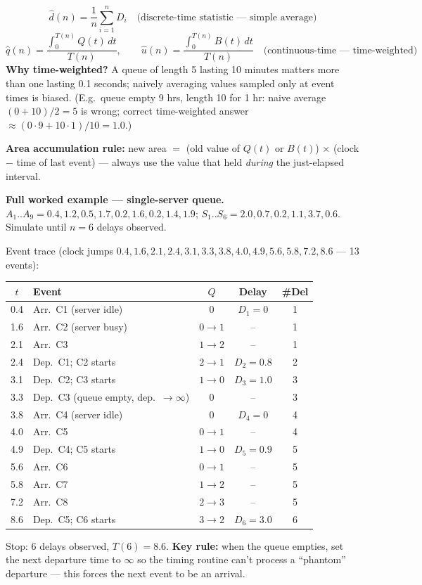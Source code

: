 \[
\hat d(n) = \frac{1}{n}\sum_{i=1}^n D_i \quad\text{(discrete-time statistic — simple average)}
\]
\[
\hat q(n) = \frac{\int_0^{T(n)}Q(t)\,dt}{T(n)}, \qquad \hat u(n) = \frac{\int_0^{T(n)}B(t)\,dt}{T(n)} \quad\text{(continuous-time — time-weighted)}
\]
\textbf{Why time-weighted?} A queue of length 5 lasting 10 minutes matters more than one lasting 0.1 seconds; naively averaging values sampled only at event times is biased. (E.g.\ queue empty 9 hrs, length 10 for 1 hr: naive average $(0+10)/2=5$ is wrong; correct time-weighted answer $\approx(0\cdot9+10\cdot1)/10=1.0$.)

\textbf{Area accumulation rule:} new area $=$ (old value of $Q(t)$ or $B(t)$) $\times$ (clock $-$ time of last event) — always use the value that held \emph{during} the just-elapsed interval.

\begin{examplebox}
\textbf{Full worked example — single-server queue.} $A_1..A_9 = 0.4,1.2,0.5,1.7,0.2,1.6,0.2,1.4,1.9$; $S_1..S_6=2.0,0.7,0.2,1.1,3.7,0.6$. Simulate until $n=6$ delays observed.

Event trace (clock jumps $0.4,1.6,2.1,2.4,3.1,3.3,3.8,4.0,4.9,5.6,5.8,7.2,8.6$ — 13 events):
\begin{center}\small
\begin{tabular}{@{}clccc@{}}
\toprule
$t$ & Event & $Q$ & Delay & \#Del\\
\midrule
0.4 & Arr.\ C1 (server idle) & 0 & $D_1{=}0$ & 1\\
1.6 & Arr.\ C2 (server busy) & $0\to1$ & -- & 1\\
2.1 & Arr.\ C3 & $1\to2$ & -- & 1\\
2.4 & Dep.\ C1; C2 starts & $2\to1$ & $D_2{=}0.8$ & 2\\
3.1 & Dep.\ C2; C3 starts & $1\to0$ & $D_3{=}1.0$ & 3\\
3.3 & Dep.\ C3 (queue empty, dep.\ $\to\infty$) & 0 & -- & 3\\
3.8 & Arr.\ C4 (server idle) & 0 & $D_4{=}0$ & 4\\
4.0 & Arr.\ C5 & $0\to1$ & -- & 4\\
4.9 & Dep.\ C4; C5 starts & $1\to0$ & $D_5{=}0.9$ & 5\\
5.6 & Arr.\ C6 & $0\to1$ & -- & 5\\
5.8 & Arr.\ C7 & $1\to2$ & -- & 5\\
7.2 & Arr.\ C8 & $2\to3$ & -- & 5\\
8.6 & Dep.\ C5; C6 starts & $3\to2$ & $D_6{=}3.0$ & 6\\
\bottomrule
\end{tabular}
\end{center}
Stop: 6 delays observed, $T(6)=8.6$. \textbf{Key rule:} when the queue empties, set the next departure time to $\infty$ so the timing routine can't process a ``phantom'' departure — this forces the next event to be an arrival.


\end{examplebox}
